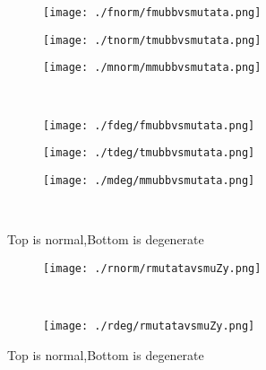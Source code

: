 \documentclass[aps,floats,floatfix,nofootinbib]{revtex4-1}
\begin{document}
\begin{center}
\begin{figure}
\begin{subfigure}{0.3\textwidth}
\texttt{[image: ./fnorm/fmubbvsmutata.png]}
\label{}
\end{subfigure}
\begin{subfigure}{0.3\textwidth}
\texttt{[image: ./tnorm/tmubbvsmutata.png]}
\label{}
\end{subfigure}
\begin{subfigure}{0.3\textwidth}
\texttt{[image: ./mnorm/mmubbvsmutata.png]}
\label{}
\end{subfigure}\\
\begin{subfigure}{0.3\textwidth}
\texttt{[image: ./fdeg/fmubbvsmutata.png]}
\label{}
\end{subfigure}
\begin{subfigure}{0.3\textwidth}
\texttt{[image: ./tdeg/tmubbvsmutata.png]}
\label{}
\end{subfigure}
\begin{subfigure}{0.3\textwidth}
\texttt{[image: ./mdeg/mmubbvsmutata.png]}
\label{}
\end{subfigure}\\
\caption{Top is normal,Bottom is degenerate}
\end{figure}
\end{center}

\begin{center}
\begin{figure}
\begin{subfigure}{0.95\textwidth}
\texttt{[image: ./rnorm/rmutatavsmuZy.png]}
\label{}
\end{subfigure}\\
\begin{subfigure}{0.95\textwidth}
\texttt{[image: ./rdeg/rmutatavsmuZy.png]}
\label{}
\end{subfigure}
\caption{Top is normal,Bottom is degenerate}
\end{figure}
\end{center}
\end{document}
